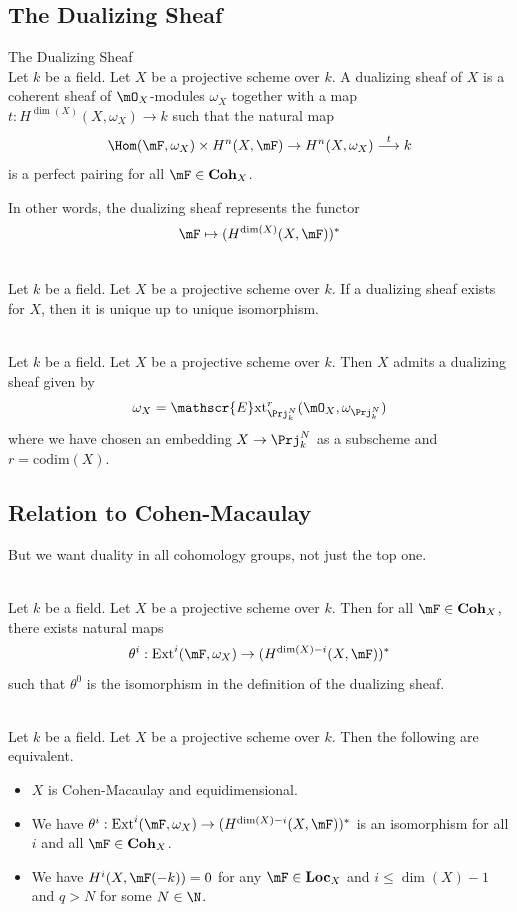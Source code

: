 \documentclass[a4paper]{article}
\begin{document}
\subsection{The Dualizing Sheaf}
\begin{defn}{The Dualizing Sheaf}{}\\
Let $k$ be a field. Let $X$ be a projective scheme over $k$. A dualizing sheaf of $X$ is a coherent sheaf of $\mO_X$-modules $\omega_X$ together with a map $t:H^{\dim(X)}(X,\omega_X)\to k$ such that the natural map $$\Hom(\mF,\omega_X)\times H^n(X,\mF)\to H^n(X,\omega_X)\overset{t}{\longrightarrow}k$$ is a perfect pairing for all $\mF\in\bold{Coh}_X$. 
\end{defn}

In other words, the dualizing sheaf represents the functor $$\mF\mapsto(H^{\dim(X)}(X,\mF))^\ast$$

\begin{prp}{}{}\\
Let $k$ be a field. Let $X$ be a projective scheme over $k$. If a dualizing sheaf exists for $X$, then it is unique up to unique isomorphism. 
\end{prp}

\begin{prp}{}{}\\
Let $k$ be a field. Let $X$ be a projective scheme over $k$. Then $X$ admits a dualizing sheaf given by $$\omega_X=\mathscr{E}\text{xt}_{\Prj_k^N}^r(\mO_X,\omega_{\Prj_k^N})$$ where we have chosen an embedding $X\to\Prj_k^N$ as a subscheme and $r=\text{codim}(X)$. 
\end{prp}

\subsection{Relation to Cohen-Macaulay}
But we want duality in all cohomology groups, not just the top one. 

\begin{prp}{}{}\\
Let $k$ be a field. Let $X$ be a projective scheme over $k$. Then for all $\mF\in\bold{Coh}_X$, there exists natural maps $$\theta^i:\text{Ext}^i(\mF,\omega_X)\to(H^{\dim(X)-i}(X,\mF))^\ast$$ such that $\theta^0$ is the isomorphism in the definition of the dualizing sheaf. 
\end{prp}

\begin{prp}{}{}\\
Let $k$ be a field. Let $X$ be a projective scheme over $k$. Then the following are equivalent. 
\begin{itemize}
\item $X$ is Cohen-Macaulay and equidimensional. 
\item We have $\theta^i:\text{Ext}^i(\mF,\omega_X)\to(H^{\dim(X)-i}(X,\mF))^\ast$ is an isomorphism for all $i$ and all $\mF\in\bold{Coh}_X$. 
\item We have $H^i(X,\mF(-k))=0$ for any $\mF\in\bold{Loc}_X$ and $i\leq\dim(X)-1$ and $q>N$ for some $N\in\N$. 
\end{itemize}
\end{prp}
\end{document}
